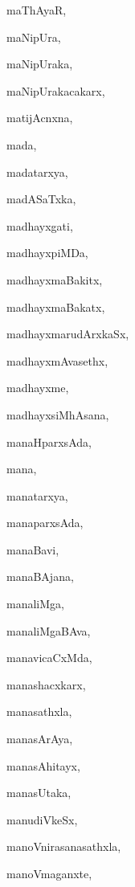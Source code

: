 \begin{multicols}{2}
{maThAyaR}, \pageref{maThAyaR}

{maNipUra}, \pageref{maNipUra}

{maNipUraka}, \pageref{maNipUraka}

{maNipUrakacakarx}, \pageref{maNipUrakacakarx}

{matijAcnxna}, \pageref{matijAcnxna}

{mada}, \pageref{mada}

{madatarxya}, \pageref{madatarxya}

{madASaTxka}, \pageref{madASaTxka}

{madhayxgati}, \pageref{madhayxgati}

{madhayxpiMDa}, \pageref{madhayxpiMDa}

{madhayxmaBakitx}, \pageref{madhayxmaBakitx}

{madhayxmaBakatx}, \pageref{madhayxmaBakatx}

{madhayxmarudArxkaSx}, \pageref{madhayxmarudArxkaSx}

{madhayxmAvasethx}, \pageref{madhayxmAvasethx}

{madhayxme}, \pageref{madhayxme}

{madhayxsiMhAsana}, \pageref{madhayxsiMhAsana}

{manaHparxsAda}, \pageref{manaHparxsAda}

{mana}, \pageref{mana}

{manatarxya}, \pageref{manatarxya}

{manaparxsAda}, \pageref{manaparxsAda}

{manaBavi}, \pageref{manaBavi}

{manaBAjana}, \pageref{manaBAjana}

{manaliMga}, \pageref{manaliMga}

{manaliMgaBAva}, \pageref{manaliMgaBAva}

{manavicaCxMda}, \pageref{manavicaCxMda}

{manashacxkarx}, \pageref{manashacxkarx}

{manasathxla}, \pageref{manasathxla}

{manasArAya}, \pageref{manasArAya}

{manasAhitayx}, \pageref{manasAhitayx}

{manasUtaka}, \pageref{manasUtaka}

{manudiVkeSx}, \pageref{manudiVkeSx}

{manoVnirasanasathxla}, \pageref{manoVnirasanasathxla}

{manoVmaganxte}, \pageref{manoVmaganxte}


\end{multicols}
